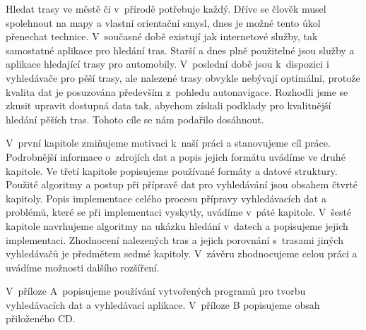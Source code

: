 
Hledat trasy ve městě či v~přírodě potřebuje každý. Dříve se člověk musel
spolehnout na mapy a vlastní orientační smysl, dnes je možné tento úkol
přenechat technice. V~současné době existují jak internetové služby, tak
samostatné aplikace pro hledání tras. Starší a dnes plně použitelné jsou služby a
aplikace hledající trasy pro automobily. V~poslední době jsou k~dispozici i
vyhledávače pro pěší trasy, ale nalezené trasy obvykle nebývají optimální,
protože kvalita dat je posuzována především z~pohledu autonavigace. Rozhodli
jsme se zkusit upravit dostupná data tak, abychom získali podklady pro
kvalitnější hledání pěších tras. Tohoto cíle se nám podařilo dosáhnout. 

V~první kapitole zmiňujeme motivaci k~naší práci a stanovujeme cíl práce.
Podrobnější informace o~zdrojích dat a popis jejich formátu uvádíme ve druhé
kapitole. Ve třetí kapitole popisujeme používané formáty a datové struktury.
Použité algoritmy a postup při přípravě dat pro vyhledávání jsou obsahem čtvrté
kapitoly. Popis implementace celého procesu přípravy vyhledávacích dat a
problémů, které se při implementaci vyskytly, uvádíme v~páté kapitole. V~šesté
kapitole navrhujeme algoritmy na ukázku hledání v~datech a popisujeme jejich
implementaci. Zhodnocení nalezených tras a jejich porovnání s~trasami jiných
vyhledávačů je předmětem sedmé kapitoly. V~závěru zhodnocujeme celou práci a
uvádíme možnosti dalšího rozšíření.

V~příloze A~popisujeme používání vytvořených programů pro tvorbu vyhledávacích
dat a vyhledávací aplikace. V~příloze B popisujeme obsah přiloženého CD.



